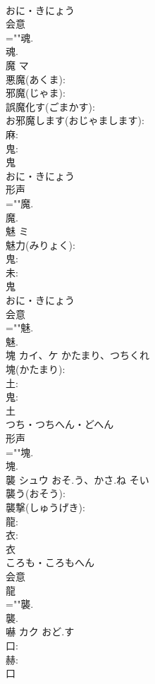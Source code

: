 \documentclass[8pt]{extreport}
\begin{document}
\begin{CJK}{UTF8}{min}
\\	おに・きにょう	
\\	会意 
\\	=""魂.
\\	魂.
\\	魔	マ			
\\	悪魔(あくま): 
\\	邪魔(じゃま): 
\\	誤魔化す(ごまかす): 
\\	お邪魔します(おじゃまします): 
\\	麻: 
\\	鬼: 
\\	鬼	
\\	おに・きにょう	
\\	形声 
\\	=""魔.
\\	魔.
\\	魅	ミ			
\\	魅力(みりょく): 
\\	鬼: 
\\	未: 
\\	鬼	
\\	おに・きにょう	
\\	会意 
\\	=""魅.
\\	魅.
\\	塊	カイ、ケ	かたまり、つちくれ		
\\	塊(かたまり): 
\\	土: 
\\	鬼: 
\\	土	
\\	つち・つちへん・どへん	
\\	形声 
\\	=""塊.
\\	塊.
\\	襲	シュウ	おそ.う、かさ.ね	そい	
\\	襲う(おそう): 
\\	襲撃(しゅうげき): 
\\	龍: 
\\	衣: 
\\	衣	
\\	ころも・ころもへん	
\\	会意 
\\	龍 
\\	=""襲.
\\	襲.
\\	嚇	カク	おど.す		
\\	口: 
\\	赫: 
\\	口	

\end{CJK}
\end{document}
